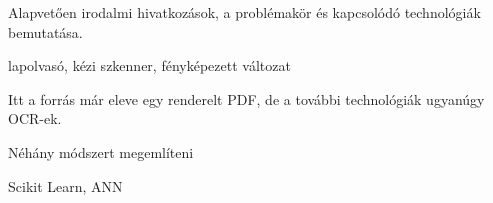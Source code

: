 
Alapvetően irodalmi hivatkozások, a problémakör és kapcsolódó technológiák bemutatása.


lapolvasó, kézi szkenner, fényképezett változat

Itt a forrás már eleve egy renderelt PDF, de a további technológiák ugyanúgy OCR-ek.


Néhány módszert megemlíteni


Scikit Learn, ANN

